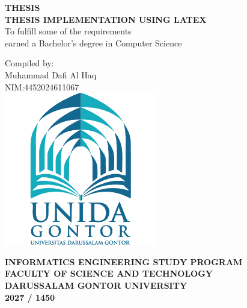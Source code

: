 \begin{titlepage}
	\centering
	{\bfseries THESIS}\\ %
	{\bfseries THESIS IMPLEMENTATION USING LATEX}\\ %
	
	\vspace*{0.5cm}
	{To fulfill some of the requirements\\}
	{earned a Bachelor's degree in Computer Science\\}
	
	\vspace*{0.5cm}
	{Compiled by:}\\
	{Muhammad Dafi Al Haq}\\  
	{NIM:4452024611067 }\\
	
	\vspace{2cm}
	\includegraphics[width=0.5\textwidth]{assets/logo.png}
	
	\vspace*{2cm}
	{\bfseries INFORMATICS ENGINEERING STUDY PROGRAM\\} 
	{\bfseries FACULTY OF SCIENCE AND TECHNOLOGY\\}
	{\bfseries DARUSSALAM GONTOR UNIVERSITY\\} 
	{\bfseries 2027 / 1450\\}
\end{titlepage}

